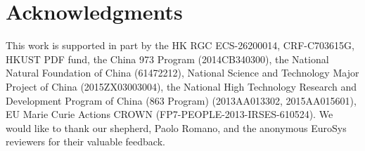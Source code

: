 \section*{Acknowledgments}
This work is supported in part by the HK RGC ECS-26200014, CRF-C703615G, HKUST PDF fund, the China 973 Program (2014CB340300), the National Natural Foundation of China (61472212), National Science and Technology Major Project of China (2015ZX03003004), the National High Technology Research and Development Program of China (863 Program) (2013AA013302, 2015AA015601), EU Marie Curie Actions CROWN (FP7-PEOPLE-2013-IRSES-610524).
We would like to thank our shepherd, Paolo Romano, and the anonymous EuroSys reviewers for their valuable feedback.
